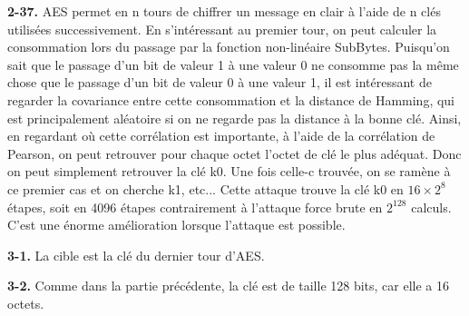 \documentclass[12pt]{article}
\begin{document}
	\noindent \textbf{2-37.} AES permet en n tours de chiffrer un message en clair à l'aide de n clés utilisées successivement. En s'intéressant au premier tour, on peut calculer la consommation lors du passage par la fonction non-linéaire SubBytes. Puisqu'on sait que le passage d'un bit de valeur 1 à une valeur 0 ne consomme pas la même chose que le passage d'un bit de valeur 0 à une valeur 1, il est intéressant de regarder la covariance entre cette consommation et la distance de Hamming, qui est principalement aléatoire si on ne regarde pas la distance à la bonne clé. Ainsi, en regardant où cette corrélation est importante, à l'aide de la corrélation de Pearson, on peut retrouver pour chaque octet l'octet de clé le plus adéquat. Donc on peut simplement retrouver la clé k0. Une fois celle-c trouvée, on se ramène à ce premier cas et on cherche k1, etc... Cette attaque trouve la clé k0 en $16 \times 2^8$ étapes, soit en 4096 étapes contrairement à l'attaque force brute en $2^{128}$ calculs. C'est une énorme amélioration lorsque l'attaque est possible.
	
	\noindent \textbf{3-1.} La cible est la clé du dernier tour d'AES.
	
	\noindent \textbf{3-2.} Comme dans la partie précédente, la clé est de taille 128 bits, car elle a 16 octets.
	
\end{document}
